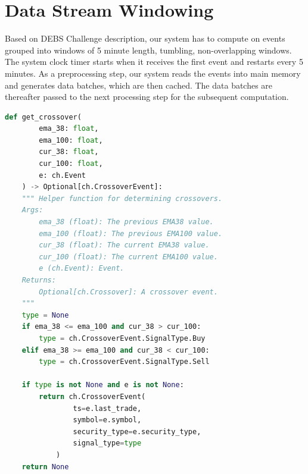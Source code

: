 
\section{Data Stream Windowing}\label{sec:windows}
Based on DEBS Challenge \cite{debs2022challenge} description, our system has to compute on events grouped into windows of 5 minute length, tumbling,
non-overlapping windows. The system clock timer starts when it receives the first event and restarts every 5 minutes. As a preprocessing step, our system reads the events
into main memory and generates data batches, which are then cached. The data batches are thereafter passed to the next processing step for the subsequent computation.




\begin{minipage}{0.9\linewidth}
    \begin{lstlisting}[caption={The computation for Query 2 - Breakout Patterns of EMA38 and EMA100}, label={lst:query2},language=Python]
    def get_crossover(
        ema_38: float,
        ema_100: float,
        cur_38: float,
        cur_100: float,
        e: ch.Event
    ) -> Optional[ch.CrossoverEvent]:
    """ Helper function for determining crossovers.
    Args:
        ema_38 (float): The previous EMA38 value.
        ema_100 (float): The previous EMA100 value.
        cur_38 (float): The current EMA38 value.
        cur_100 (float): The current EMA100 value.
        e (ch.Event): Event.
    Returns:
        Optional[ch.Crossover]: A crossover event.
    """
    type = None
    if ema_38 <= ema_100 and cur_38 > cur_100:
        type = ch.CrossoverEvent.SignalType.Buy
    elif ema_38 >= ema_100 and cur_38 < cur_100:
        type = ch.CrossoverEvent.SignalType.Sell

    if type is not None and e is not None:
        return ch.CrossoverEvent(
                ts=e.last_trade,
                symbol=e.symbol,
                security_type=e.security_type,
                signal_type=type
            )
    return None
    \end{lstlisting}
    \end{minipage}




